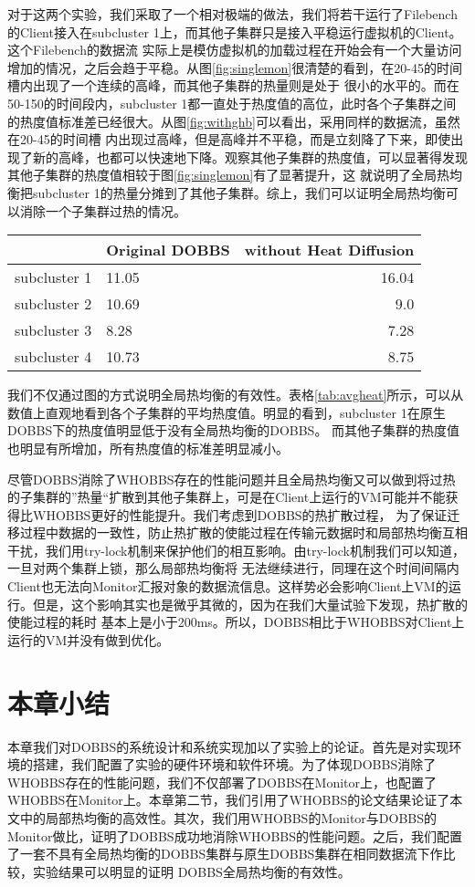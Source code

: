 对于这两个实验，我们采取了一个相对极端的做法，我们将若干运行了Filebench的Client接入在subcluster 1上，而其他子集群只是接入平稳运行虚拟机的Client。这个Filebench的数据流
实际上是模仿虚拟机的加载过程在开始会有一个大量访问增加的情况，之后会趋于平稳。从图\ref{fig:singlemon}很清楚的看到，在20-45的时间槽内出现了一个连续的高峰，而其他子集群的热量则是处于
很小的水平的。而在50-150的时间段内，subcluster 1都一直处于热度值的高位，此时各个子集群之间的热度值标准差已经很大。从图\ref{fig:withghb}可以看出，采用同样的数据流，虽然在20-45的时间槽
内出现过高峰，但是高峰并不平稳，而是立刻降了下来，即使出现了新的高峰，也都可以快速地下降。观察其他子集群的热度值，可以显著得发现其他子集群的热度值相较于图\ref{fig:singlemon}有了显著提升，这
就说明了全局热均衡把subcluster 1的热量分摊到了其他子集群。综上，我们可以证明全局热均衡可以消除一个子集群过热的情况。

\begin{table}
    \centering
    \begin{tabular}{@{}llr@{}} \toprule
       & Original DOBBS & without Heat Diffusion\\ \midrule
      subcluster 1 & 11.05 & 16.04 \\
      subcluster 2 & 10.69 & 9.0 \\
      subcluster 3 & 8.28 & 7.28 \\
      subcluster 4 & 10.73 & 8.75 \\
    \end{tabular}
\end{table}

我们不仅通过图的方式说明全局热均衡的有效性。表格\ref{tab:avgheat}所示，可以从数值上直观地看到各个子集群的平均热度值。明显的看到，subcluster 1在原生DOBBS下的热度值明显低于没有全局热均衡的DOBBS。
而其他子集群的热度值也明显有所增加，所有热度值的标准差明显减小。

尽管DOBBS消除了WHOBBS存在的性能问题并且全局热均衡又可以做到将过热的子集群的”热量“扩散到其他子集群上，可是在Client上运行的VM可能并不能获得比WHOBBS更好的性能提升。我们考虑到DOBBS的热扩散过程，
为了保证迁移过程中数据的一致性，防止热扩散的使能过程在传输元数据时和局部热均衡互相干扰，我们用try-lock机制来保护他们的相互影响。由try-lock机制我们可以知道，一旦对两个集群上锁，那么局部热均衡将
无法继续进行，同理在这个时间间隔内Client也无法向Monitor汇报对象的数据流信息。这样势必会影响Client上VM的运行。但是，这个影响其实也是微乎其微的，因为在我们大量试验下发现，热扩散的使能过程的耗时
基本上是小于200ms。所以，DOBBS相比于WHOBBS对Client上运行的VM并没有做到优化。

\section{本章小结}
本章我们对DOBBS的系统设计和系统实现加以了实验上的论证。首先是对实现环境的搭建，我们配置了实验的硬件环境和软件环境。为了体现DOBBS消除了WHOBBS存在的性能问题，我们不仅部署了DOBBS在Monitor上，也配置了WHOBBS在Monitor上。本章第二节，我们引用了WHOBBS的论文结果论证了本文中的局部热均衡的高效性。其次，我们用WHOBBS的Monitor与DOBBS的Monitor做比，证明了DOBBS成功地消除WHOBBS的性能问题。之后，我们配置了一套不具有全局热均衡的DOBBS集群与原生DOBBS集群在相同数据流下作比较，实验结果可以明显的证明
DOBBS全局热均衡的有效性。
